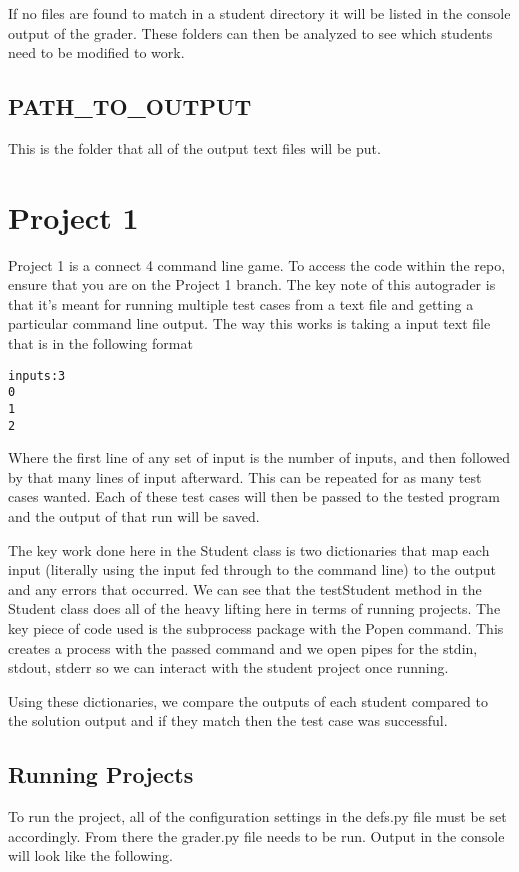 \documentclass[10pt,a4paper]{book}
\begin{document}
If no files are found to match in a student directory it will be listed in the console output of the grader. These folders can then be analyzed to see which students need to be modified to work.

\section{PATH\_TO\_OUTPUT}
This is the folder that all of the output text files will be put.

\chapter{Project 1}
Project 1 is a connect 4 command line game. To access the code within the repo, ensure that you are on the Project 1 branch. The key note of this autograder is that it's meant for running multiple test cases from a text file and getting a particular command line output. The way this works is taking a input text file that is in the following format

\begin{verbatim}
inputs:3
0
1
2
\end{verbatim}

Where the first line of any set of input is the number of inputs, and then followed by that many lines of input afterward. This can be repeated for as many test cases wanted. Each of these test cases will then be passed to the tested program and the output of that run will be saved.

The key work done here in the Student class is two dictionaries that map each input (literally using the input fed through to the command line) to the output and any errors that occurred. We can see that the testStudent method in the Student class does all of the heavy lifting here in terms of running projects. The key piece of code used is the subprocess package with the Popen command. This creates a process with the passed command and we open pipes for the stdin, stdout, stderr so we can interact with the student project once running.

Using these dictionaries, we compare the outputs of each student compared to the solution output and if they match then the test case was successful.

\section{Running Projects}
To run the project, all of the configuration settings in the defs.py file must be set accordingly. From there the grader.py file needs to be run. Output in the console will look like the following.
\end{document}
